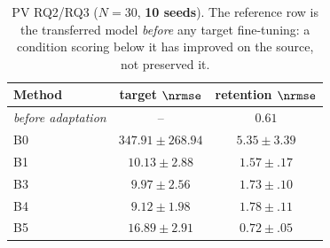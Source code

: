 \begin{table}[t]
\centering
\caption{PV RQ2/RQ3 ($N{=}30$, \textbf{10 seeds}). The reference row is the transferred model \emph{before} any target fine-tuning: a condition scoring below it has improved on the source, not preserved it.}
\label{tab:pv}
\begin{tabular}{lcc}
\toprule
Method & target $\nrmse$ & retention $\nrmse$\\
\midrule
\emph{before adaptation} & -- & $\mathit{0.61}$\\
\midrule
B0 & $347.91\pm268.94$ & $5.35\pm3.39$\\
B1 & $10.13\pm2.88$ & $1.57\pm.17$\\
B3 & $9.97\pm2.56$ & $1.73\pm.10$\\
B4 & $9.12\pm1.98$ & $1.78\pm.11$\\
B5 & $16.89\pm2.91$ & $0.72\pm.05$\\
\bottomrule
\end{tabular}
\end{table}
